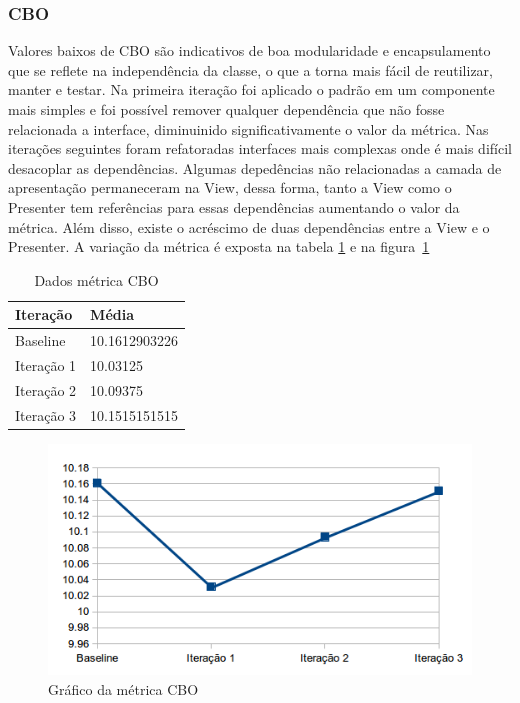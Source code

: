 \documentclass[conference]{IEEEtran}
\begin{document}
\subsubsection{CBO}

Valores baixos de CBO são indicativos de boa modularidade e encapsulamento que
se reflete na independência da classe, o que a torna mais fácil de reutilizar,
manter e testar.
Na primeira iteração foi aplicado o padrão em um componente mais simples e foi
possível remover qualquer dependência que não fosse relacionada a interface,
diminuinido significativamente o valor da métrica. Nas iterações seguintes foram
refatoradas interfaces mais complexas onde é mais difícil desacoplar as
dependências. Algumas depedências não relacionadas a camada de apresentação
permaneceram na View, dessa forma, tanto a View como o Presenter tem referências
para essas dependências aumentando o valor da métrica. Além disso, existe o
acréscimo de duas dependências entre a View e o Presenter. A variação da métrica
é exposta na tabela \ref{tab:cbo} e na figura~\ref{fig:cbo}

\begin{table}[!h]
	\centering
	    \caption{\label{tab:cbo} Dados métrica CBO}
	
    \begin{tabular}{ | l | l | }
    \hline
    Iteração & Média 			\\ \hline
    Baseline & 10.1612903226   	\\ \hline
    Iteração 1 & 10.03125		\\ \hline
	Iteração 2 & 10.09375		\\ \hline
	Iteração 3 & 10.1515151515	\\ \hline
    \end{tabular}
    
\end{table}

\begin{figure}[!htb]
	\begin{center}
		\includegraphics[scale=0.7]{img/cbo.png}
	\end{center}
	\caption{\label{fig:cbo} Gráfico da métrica CBO}   
	
\end{figure}
\end{document}
